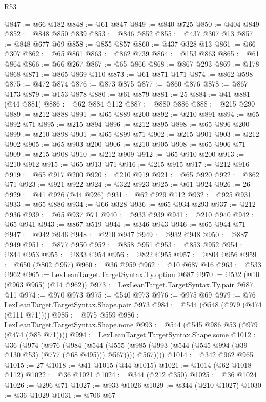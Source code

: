 \begin{lexlean}{R53}
\begin{coremodule}
@847 := @66 @182
@848 := @61 @847
@849 := @840 @725
@850 := @404 @849
@852 := @848 @850 @839
@853 := @846 @852
@855 := @437 @307 @13
@857 := @848 @677 @69
@858 := @855 @857
@860 := @437 @328 @13
@861 := @66 @307
@862 := @65 @861
@863 := @862 @739
@864 := @153 @863
@865 := @61 @864
@866 := @66 @267
@867 := @65 @866
@868 := @867 @293
@869 := @178 @868
@871 := @865 @869 @110
@873 := @61 @871 @171
@874 := @862 @598
@875 := @472 @874
@876 := @873 @875
@877 := @860 @876
@878 := @867 @173
@879 := @153 @878
@880 := @61 @879
@881 := 25
@884 := @41 @881 (@44 @881)
@886 := @62 @884 @112
@887 := @880 @886
@888 := @215 @290
@889 := @212 @888
@891 := @65 @889 @200
@892 := @210 @891
@894 := @65 @892 @71
@895 := @215 @894
@896 := @212 @895
@898 := @65 @896 @200
@899 := @210 @898
@901 := @65 @899 @71
@902 := @215 @901
@903 := @212 @902
@905 := @65 @903 @200
@906 := @210 @905
@908 := @65 @906 @71
@909 := @215 @908
@910 := @212 @909
@912 := @65 @910 @200
@913 := @210 @912
@915 := @65 @913 @71
@916 := @215 @915
@917 := @212 @916
@919 := @65 @917 @200
@920 := @210 @919
@921 := @65 @920
@922 := @862 @71
@923 := @921 @922
@924 := @322 @923
@925 := @61 @924
@926 := 26
@929 := @41 @926 (@44 @926)
@931 := @62 @929 @112
@932 := @925 @931
@933 := @65 @886
@934 := @66 @328
@936 := @65 @934 @293
@937 := @212 @936
@939 := @65 @937 @71
@940 := @933 @939
@941 := @210 @940
@942 := @65 @941
@943 := @867 @519
@944 := @346 @943
@946 := @65 @944 @71
@947 := @942 @946
@948 := @210 @947
@949 := @932 @948
@950 := @887 @949
@951 := @877 @950
@952 := @858 @951
@953 := @853 @952
@954 := @844 @953
@955 := @833 @954
@956 := @822 @955
@957 := @804 @956
@959 := @650 (@802 @957)
@960 := @36 @959
@962 := @10 @687 @16
@963 := @533 @962
@965 := LexLeanTarget.TargetSyntax.Ty.option @687
@970 := @532 (@10 (@963 @965) (@14 @962))
@973 := LexLeanTarget.TargetSyntax.Ty.pair @687 @11
@974 := @970 @973
@975 := @540 @973
@976 := @975 @69
@979 := @76 LexLeanTarget.TargetSyntax.Shape.pair @973
@984 := @544 (@548 (@979 (@474 (@111 @71))))
@985 := @975 @559
@986 := LexLeanTarget.TargetSyntax.Shape.none
@993 := @544 (@545 @986 @53 (@979 (@474 (@85 @71))))
@994 := LexLeanTarget.TargetSyntax.Shape.some
@1012 := @36
    (@974
      (@976
        (@984
          (@544
            (@555 (@985 (@993 (@544 (@545 @994 (@39 @130 @53) (@777 (@68 @495))) @567))))
            @567))))
@1014 := @342 @962 @965
@1015 := 27
@1018 := @41 @1015 (@44 @1015)
@1021 := @1014 (@62 @1018 @112)
@1022 := @36 @1021
@1024 := @344 (@212 @350)
@1025 := @36 @1024
@1026 := @296 @71
@1027 := @933 @1026
@1029 := @344 (@210 @1027)
@1030 := @36 @1029
@1031 := @706 @67

\end{coremodule}
\end{lexlean}
